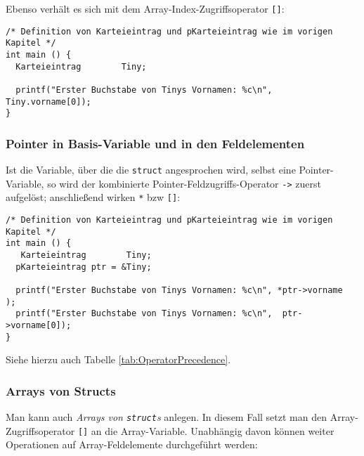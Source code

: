 Ebenso verhält es sich mit dem Array-Index-Zugriffsoperator \texttt{[]}:
\begin{codebox}
\begin{verbatim}
/* Definition von Karteieintrag und pKarteieintrag wie im vorigen Kapitel */
int main () {
  Karteieintrag        Tiny;
  
  printf("Erster Buchstabe von Tinys Vornamen: %c\n", Tiny.vorname[0]);
}
\end{verbatim}
\end{codebox}

\subsubsection{Pointer in Basis-Variable und in den Feldelementen}
Ist die Variable, über die die \texttt{struct} angesprochen wird, selbst eine Pointer-Variable, so wird der kombinierte Pointer-Feldzugriffs-Operator \texttt{->} zuerst aufgelöst; anschließend wirken \texttt{*} bzw \texttt{[]}:

\begin{codebox}
\begin{verbatim}
/* Definition von Karteieintrag und pKarteieintrag wie im vorigen Kapitel */
int main () {
   Karteieintrag        Tiny;
  pKarteieintrag ptr = &Tiny;
  
  printf("Erster Buchstabe von Tinys Vornamen: %c\n", *ptr->vorname   );
  printf("Erster Buchstabe von Tinys Vornamen: %c\n",  ptr->vorname[0]);
}
\end{verbatim}
\end{codebox}

Siehe hierzu auch Tabelle \ref{tab:OperatorPrecedence}.

\subsubsection{Arrays von Structs}
Man kann auch \emph{Arrays von \texttt{struct}s} anlegen. In diesem Fall setzt man den Array-Zugriffsoperator \texttt{[]} an die Array-Variable. Unabhängig davon können weiter Operationen auf Array-Feldelemente durchgeführt werden:

